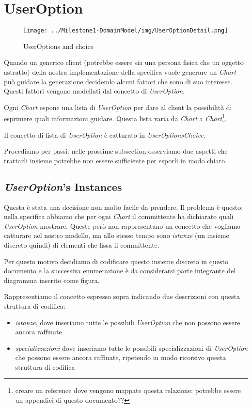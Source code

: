 \section{UserOption}
\label{sec:userOption}

\begin{figure}[h!] 
	\centering
	\texttt{[image: ../Milestone1-DomainModel/img/UserOptionDetail.png]}
	\caption{UserOptions and choice}
	\label{fig:userOption} 
\end{figure}

Quando un generico client (potrebbe essere sia una persona fisica che un
oggetto astratto) della nostra implementazione della specifica vuole generare
un \emph{Chart} pu\`o guidare la generazione decidendo alcuni fattori che sono
di suo interesse. Questi fattori vengono modellati dal concetto di
\emph{UserOption}.

Ogni \emph{Chart} espone una lista di \emph{UserOption} per dare al client la
possibilit\`a di esprimere quali informazioni guidare. Questa lista varia da
\emph{Chart} a \emph{Chart}\footnote{creare un reference dove vengono mappate
questa relazione: potrebbe essere un appendici di questo documento??}.

Il concetto di lista di \emph{UserOption} \`e catturato in
\emph{UserOptionsChoice}.

Procediamo per passi: nelle prossime subsection osserviamo due aspetti che
trattarli insieme potrebbe non essere sufficiente per esporli in modo chiaro.

\subsection{\emph{UserOption}'s Instances}
\label{subsec:UserOptionInstances}
Questa \`e stata una decisione non molto facile da prendere. Il problema \`e
questo: nella specifica abbiamo che per ogni \emph{Chart} il committente ha
dichiarato quali \emph{UserOption} mostrare. Queste per\`o non rappresentano un
concetto che vogliamo catturare nel nostro modello, ma allo stesso tempo sono
\emph{istanze} (un insieme discreto quindi) di elementi che fissa il
committente.

Per questo motivo decidiamo di codificare questo insieme discreto in questo
documento e la successiva enumerazione \`e da considerarsi parte integrante del
diagramma inserito come figura.

Rappresentiamo il concetto espresso sopra indicando due descrizioni con questa
struttura di codifica:
\begin{itemize}
  \item \emph{istanze}, dove inseriamo tutte le possibili \emph{UserOption} che
  non possono essere ancora raffinate
  \item \emph{specializzazioni} dove inseriamo tutte le possibili
  specializzazioni di \emph{UserOption} che possono essere ancora raffinate,
  ripetendo in modo ricorsivo questa struttura di codifica
\end{itemize}

